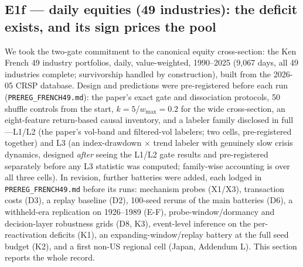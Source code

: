 \documentclass{article}
\begin{document}
\subsection{E1f --- daily equities (49 industries): the deficit exists,
and its sign prices the pool}
\label{sec:e1f}

We took the two-gate commitment to the canonical equity cross-section:
the Ken French 49 industry portfolios, daily, value-weighted, 1990--2025
(9{,}067 days, all 49 industries complete; survivorship handled by
construction), built from the 2026-05 CRSP database. Design and
predictions were pre-registered before each run
(\texttt{PREREG\_FRENCH49.md}): the paper's exact gate and dissociation
protocols, 50 shuffle controls from the start, $k{=}5$/$w_{\max}{=}0.2$
for the wide cross-section, an eight-feature return-based causal inventory,
and a labeler family disclosed in full---L1/L2 (the paper's vol-band and
filtered-vol labelers; two cells, pre-registered together) and L3 (an
index-drawdown $\times$ trend labeler with genuinely slow crisis
dynamics, designed \emph{after} seeing the L1/L2 gate results and
pre-registered separately before any L3 statistic was computed;
family-wise accounting is over all three cells). In revision, further
batteries were added, each lodged in
\texttt{PREREG\_FRENCH49.md} before its runs: mechanism probes
(X1/X3), transaction costs (D3), a replay baseline (D2), 100-seed
reruns of the main batteries (D6), a withheld-era replication on
1926--1989 (E-F), probe-window/dormancy and decision-layer
robustness grids (D8, K3), event-level inference on the
per-reactivation deficits (K1), an expanding-window/replay battery
at the full seed budget (K2), and a first non-US regional cell
(Japan, Addendum L). This section reports the whole record.
\end{document}
